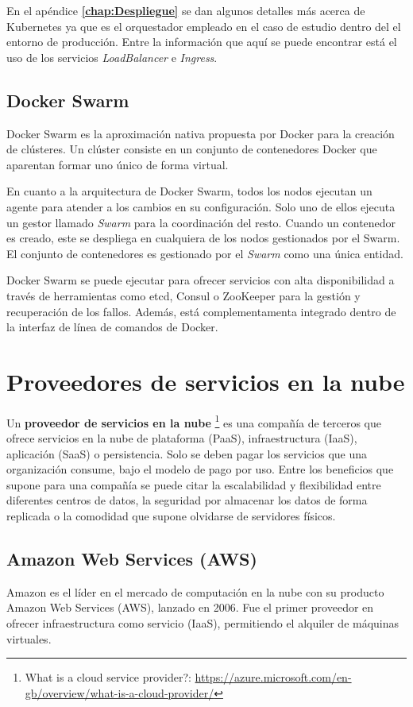 \documentclass[11pt,spanish,listoffigures]{tfgetsinf}
\begin{document}
En el apéndice \textbf{\ref{chap:Despliegue} } se dan algunos detalles más acerca de Kubernetes ya que es el orquestador empleado en el caso de estudio dentro del el entorno de producción. Entre la información que aquí se puede encontrar está el uso de los servicios \textit{LoadBalancer} e \textit{Ingress}.

\subsection{Docker Swarm}

Docker Swarm \cite{DeAlfonso2017} es la aproximación nativa propuesta por Docker para la creación de clústeres. Un clúster consiste en un conjunto de contenedores Docker que aparentan formar uno único de forma virtual.

En cuanto a la arquitectura de Docker Swarm, todos los nodos ejecutan un agente para atender a los cambios en su configuración. Solo uno de ellos ejecuta un gestor llamado \textit{Swarm} para la coordinación del resto. Cuando un contenedor es creado, este se despliega en cualquiera de los nodos gestionados por el Swarm. El conjunto de contenedores es gestionado por el \textit{Swarm} como una única entidad.

Docker Swarm se puede ejecutar para ofrecer servicios con alta disponibilidad a través de herramientas como etcd, Consul o ZooKeeper para la gestión y recuperación de los fallos. Además, está complementamenta integrado dentro de la interfaz de línea de comandos de Docker.

\section{Proveedores de servicios en la nube}

Un \textbf{proveedor de servicios en la nube} \footnote{ What is a cloud service provider?: \url{https://azure.microsoft.com/en-gb/overview/what-is-a-cloud-provider/}} es una compañía de terceros que ofrece servicios en la nube de plataforma (PaaS), infraestructura (IaaS), aplicación (SaaS) o persistencia. Solo se deben pagar los servicios que una organización consume, bajo el modelo de pago por uso. Entre los beneficios que supone para una compañía se puede citar la escalabilidad y flexibilidad entre diferentes centros de datos, la seguridad por almacenar los datos de forma replicada o la comodidad que supone olvidarse de servidores físicos.

\subsection{Amazon Web Services (AWS)}
Amazon es el líder en el mercado de computación en la nube con su producto Amazon Web Services (AWS), lanzado en 2006. Fue el primer proveedor en ofrecer infraestructura como servicio (IaaS), permitiendo el alquiler de máquinas virtuales.
\end{document}
